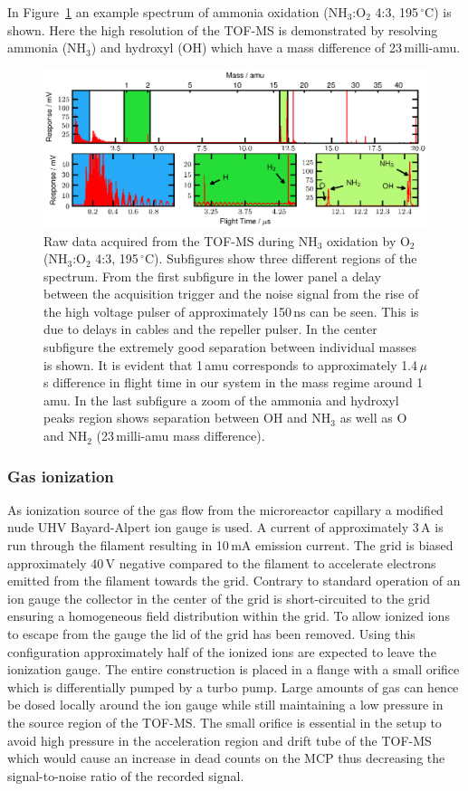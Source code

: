 \documentclass[aip,rsi]{revtex4-1}
\begin{document}
In Figure~\ref{fig:untreated_data} an example spectrum of ammonia oxidation (NH$_3$:O$_2$ 4:3, 195\,$^{\circ}$C) is shown. Here the high resolution of the TOF-MS is demonstrated by resolving ammonia (NH$_3$) and hydroxyl (OH) which have a mass difference of 23\,milli-amu.
\begin{figure}
 \includegraphics[width=17cm]{untreated_data.eps}%
 \caption{Raw data acquired from the TOF-MS during NH$_3$ oxidation by O$_2$ (NH$_3$:O$_2$ 4:3, 195\,$^{\circ}$C). Subfigures show three different regions of the spectrum. From the first subfigure in the lower panel a delay between the acquisition trigger and the noise signal from the rise of the high voltage pulser of approximately 150\,ns can be seen. This is due to delays in cables and the repeller pulser. In the center subfigure the extremely good separation between individual masses is shown. It is evident that 1\,amu corresponds to approximately 1.4\,$\mu$s difference in flight time in our system in the mass regime around 1\,amu. In the last subfigure a zoom of the ammonia and hydroxyl peaks region shows separation between OH and NH$_3$ as well as O and NH$_2$  (23\,milli-amu mass difference).\label{fig:untreated_data}}%
\end{figure}

\subsubsection{Gas ionization}
As ionization source of the gas flow from the microreactor capillary a modified nude UHV Bayard-Alpert ion gauge is used. A current of approximately 3\,A is run through the filament resulting in 10\,mA emission current. The grid is biased approximately 40\,V negative compared to the filament to accelerate electrons emitted from the filament towards the grid. Contrary to standard operation of an ion gauge the collector in the center of the grid is short-circuited to the grid ensuring a homogeneous field distribution within the grid. To allow ionized ions to escape from the gauge the lid of the grid has been removed. Using this configuration approximately half of the ionized ions are expected to leave the ionization gauge\cite{Nottingham1955}. The entire construction is placed in a flange with a small orifice which is differentially pumped by a turbo pump. Large amounts of gas can hence be dosed locally around the ion gauge while still maintaining a low pressure in the source region of the TOF-MS. The small orifice is essential in the setup to avoid high pressure in the acceleration region and drift tube of the TOF-MS which would cause an increase in dead counts on the MCP thus decreasing the signal-to-noise ratio of the recorded signal.
\end{document}
